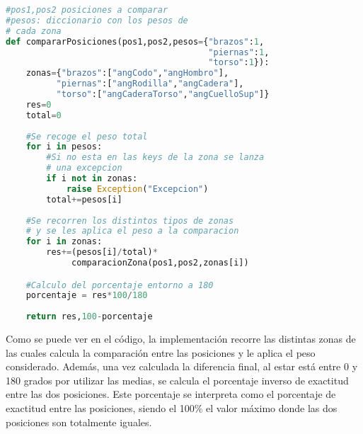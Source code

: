 \begin{lstlisting}[language=Python]
#pos1,pos2 posiciones a comparar
#pesos: diccionario con los pesos de
# cada zona
def compararPosiciones(pos1,pos2,pesos={"brazos":1,
										"piernas":1,
										"torso":1}):
    zonas={"brazos":["angCodo","angHombro"],
    	  "piernas":["angRodilla","angCadera"],
    	  "torso":["angCaderaTorso","angCuelloSup"]}
    res=0
    total=0
    
    #Se recoge el peso total
    for i in pesos:
    	#Si no esta en las keys de la zona se lanza
    	# una excepcion
        if i not in zonas:
            raise Exception("Excepcion")
        total+=pesos[i]
        
    #Se recorren los distintos tipos de zonas
    # y se les aplica el peso a la comparacion
    for i in zonas:
        res+=(pesos[i]/total)*
        	 comparacionZona(pos1,pos2,zonas[i])

	#Calculo del porcentaje entorno a 180
    porcentaje = res*100/180
 
    return res,100-porcentaje
\end{lstlisting}

Como se puede ver en el código, la implementación recorre las distintas zonas de las cuales calcula la comparación entre las posiciones y le aplica el peso considerado. Además, una vez calculada la diferencia final, al estar está entre 0 y 180 grados por utilizar las medias, se calcula el porcentaje inverso de exactitud entre las dos posiciones. Este porcentaje se interpreta como el porcentaje de exactitud entre las posiciones, siendo el 100\% el valor máximo donde las dos posiciones son totalmente iguales.

